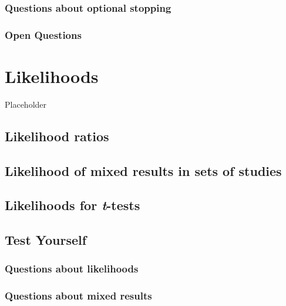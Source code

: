 \documentclass[
  oneside]{krantz}
\begin{document}
\hypertarget{questions-about-optional-stopping}{%
\subsubsection{Questions about optional
stopping}\label{questions-about-optional-stopping}}

\hypertarget{open-questions-1}{%
\subsubsection{Open Questions}\label{open-questions-1}}

\hypertarget{likelihoods}{%
\section{Likelihoods}\label{likelihoods}}

Placeholder

\hypertarget{likelihood-ratios}{%
\subsection{Likelihood ratios}\label{likelihood-ratios}}

\hypertarget{likelihood-of-mixed-results-in-sets-of-studies}{%
\subsection{Likelihood of mixed results in sets of
studies}\label{likelihood-of-mixed-results-in-sets-of-studies}}

\hypertarget{likettest}{%
\subsection{\texorpdfstring{Likelihoods for
\emph{t}-tests}{Likelihoods for t-tests}}\label{likettest}}

\hypertarget{test-yourself-2}{%
\subsection{Test Yourself}\label{test-yourself-2}}

\hypertarget{questions-about-likelihoods}{%
\subsubsection{Questions about
likelihoods}\label{questions-about-likelihoods}}

\hypertarget{questions-about-mixed-results}{%
\subsubsection{Questions about mixed
results}\label{questions-about-mixed-results}}
\end{document}

